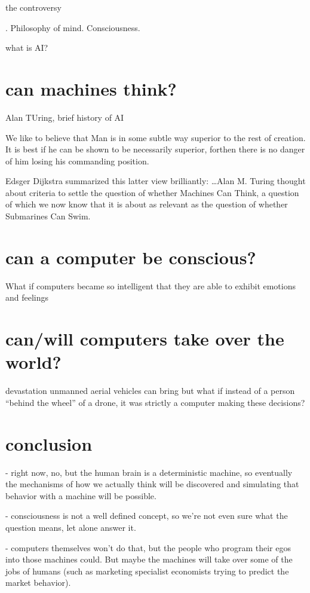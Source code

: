 \documentclass{article}
\begin{document}
the controversy


. Philosophy of mind. Consciousness.

what is AI?

\section{can machines think?}

Alan TUring, brief history of AI

We like to believe that Man is in some subtle way
superior to the rest of creation. It is best if he can be shown to be necessarily superior, forthen there is no danger of him losing his commanding position.


Edsger Dijkstra summarized this latter view brilliantly:
…Alan M. Turing thought about criteria to settle the question of
whether Machines Can Think, a question of which we now know that it is
about as relevant as the question of whether Submarines Can Swim.

\section{can a computer be conscious?}

What if computers became so intelligent that they
are able to exhibit emotions and feelings

\section{can/will computers take over the world?}

devastation unmanned aerial
vehicles can bring but what if instead of a person “behind the wheel”
of a drone, it was strictly a computer making these decisions?

\section{conclusion}

- right now, no, but the human brain is a deterministic machine, so
eventually the mechanisms of how we actually think will be discovered
and simulating that behavior with a machine will be possible.

- consciousness is not a well defined concept, so we're not even sure
what the question means, let alone answer it.

- computers themselves won't do that, but the people who program their
egos into those machines could. But maybe the machines will take over
some of the jobs of humans (such as marketing specialist economists
trying to predict the market behavior).
\end{document}
